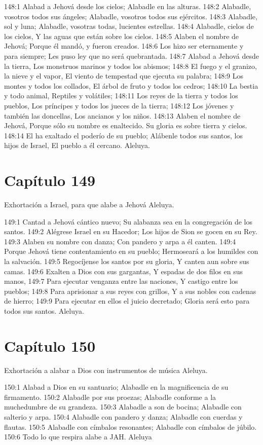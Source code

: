 148:1 Alabad a Jehová desde los cielos; 
Alabadle en las alturas. 
148:2 Alabadle, vosotros todos sus ángeles; 
Alabadle, vosotros todos sus ejércitos. 
148:3 Alabadle, sol y luna; 
Alabadle, vosotras todas, lucientes estrellas. 
148:4 Alabadle, cielos de los cielos, 
Y las aguas que están sobre los cielos. 
148:5 Alaben el nombre de Jehová; 
Porque él mandó, y fueron creados. 
148:6 Los hizo ser eternamente y para siempre; 
Les puso ley que no será quebrantada. 
148:7 Alabad a Jehová desde la tierra, 
Los monstruos marinos y todos los abismos; 
148:8 El fuego y el granizo, la nieve y el vapor, 
El viento de tempestad que ejecuta su palabra; 
148:9 Los montes y todos los collados, 
El árbol de fruto y todos los cedros; 
148:10 La bestia y todo animal, 
Reptiles y volátiles; 
148:11 Los reyes de la tierra y todos los pueblos, 
Los príncipes y todos los jueces de la tierra; 
148:12 Los jóvenes y también las doncellas, 
Los ancianos y los niños. 
148:13 Alaben el nombre de Jehová, 
Porque sólo su nombre es enaltecido. 
Su gloria es sobre tierra y cielos. 
148:14 El ha exaltado el poderío de su pueblo; 
Alábenle todos sus santos, los hijos de Israel, 
El pueblo a él cercano. 
Aleluya. 
\section*{Capítulo 149}
Exhortación a Israel, para que alabe a Jehová 
Aleluya. 
 
149:1 Cantad a Jehová cántico nuevo; 
Su alabanza sea en la congregación de los santos. 
149:2 Alégrese Israel en su Hacedor; 
Los hijos de Sion se gocen en su Rey. 
149:3 Alaben su nombre con danza; 
Con pandero y arpa a él canten. 
149:4 Porque Jehová tiene contentamiento en su pueblo; 
Hermoseará a los humildes con la salvación. 
149:5 Regocíjense los santos por su gloria, 
Y canten aun sobre sus camas. 
149:6 Exalten a Dios con sus gargantas, 
Y espadas de dos filos en sus manos, 
149:7 Para ejecutar venganza entre las naciones, 
Y castigo entre los pueblos; 
149:8 Para aprisionar a sus reyes con grillos, 
Y a sus nobles con cadenas de hierro; 
149:9 Para ejecutar en ellos el juicio decretado; 
Gloria será esto para todos sus santos. 
Aleluya. 
\section*{Capítulo 150}
Exhortación a alabar a Dios con instrumentos de música 
Aleluya. 
 
150:1 Alabad a Dios en su santuario; 
Alabadle en la magnificencia de su firmamento. 
150:2 Alabadle por sus proezas; 
Alabadle conforme a la muchedumbre de su grandeza. 
150:3 Alabadle a son de bocina; 
Alabadle con salterio y arpa. 
150:4 Alabadle con pandero y danza; 
Alabadle con cuerdas y flautas. 
150:5 Alabadle con címbalos resonantes; 
Alabadle con címbalos de júbilo. 
150:6 Todo lo que respira alabe a JAH. 
Aleluya
